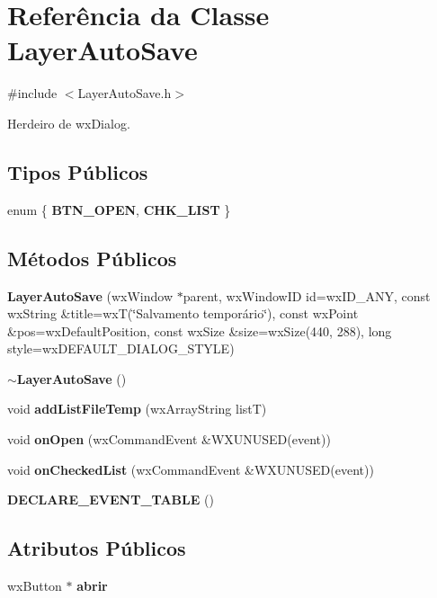 \section{Referência da Classe Layer\+Auto\+Save}
\label{class_layer_auto_save}


{\ttfamily \#include $<$Layer\+Auto\+Save.\+h$>$}



Herdeiro de wx\+Dialog.

\subsection*{Tipos Públicos}
\begin{DoxyCompactItemize}
\item 
enum \{ {\bf B\+T\+N\+\_\+\+O\+P\+EN}, 
{\bf C\+H\+K\+\_\+\+L\+I\+ST}
 \}
\end{DoxyCompactItemize}
\subsection*{Métodos Públicos}
\begin{DoxyCompactItemize}
\item 
{\bf Layer\+Auto\+Save} (wx\+Window $\ast$parent, wx\+Window\+ID id=wx\+I\+D\+\_\+\+A\+NY, const wx\+String \&title=wxT(\char`\"{}Salvamento temporário\char`\"{}), const wx\+Point \&pos=wx\+Default\+Position, const wx\+Size \&size=wx\+Size(440, 288), long style=wx\+D\+E\+F\+A\+U\+L\+T\+\_\+\+D\+I\+A\+L\+O\+G\+\_\+\+S\+T\+Y\+LE)
\item 
{\bf $\sim$\+Layer\+Auto\+Save} ()
\item 
void {\bf add\+List\+File\+Temp} (wx\+Array\+String listT)
\item 
void {\bf on\+Open} (wx\+Command\+Event \&W\+X\+U\+N\+U\+S\+ED(event))
\item 
void {\bf on\+Checked\+List} (wx\+Command\+Event \&W\+X\+U\+N\+U\+S\+ED(event))
\item 
{\bf D\+E\+C\+L\+A\+R\+E\+\_\+\+E\+V\+E\+N\+T\+\_\+\+T\+A\+B\+LE} ()
\end{DoxyCompactItemize}
\subsection*{Atributos Públicos}
\begin{DoxyCompactItemize}
\item 
wx\+Button $\ast$ {\bf abrir}
\end{DoxyCompactItemize}
